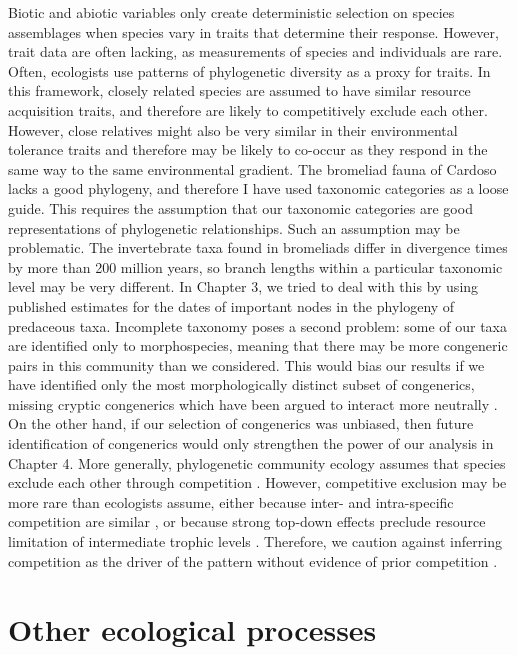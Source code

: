 Biotic and abiotic variables only create deterministic selection on
species assemblages when species vary in traits that determine their
response. However, trait data are often lacking, as measurements of
species and individuals are rare. Often, ecologists use patterns of
phylogenetic diversity as a proxy for traits. In this framework, closely
related species are assumed to have similar resource acquisition traits,
and therefore are likely to competitively exclude each other. However,
close relatives might also be very similar in their environmental
tolerance traits and therefore may be likely to co-occur as they respond
in the same way to the same environmental gradient. The bromeliad fauna
of Cardoso lacks a good phylogeny, and therefore I have used taxonomic
categories as a loose guide. This requires the assumption that our
taxonomic categories are good representations of phylogenetic
relationships. Such an assumption may be problematic. The invertebrate
taxa found in bromeliads differ in divergence times by more than 200
million years, so branch lengths within a particular taxonomic level may
be very different. In Chapter 3, we tried to deal with this by using
published estimates for the dates of important nodes in the phylogeny of
predaceous taxa. Incomplete taxonomy poses a second problem: some of our
taxa are identified only to morphospecies, meaning that there may be
more congeneric pairs in this community than we considered. This would
bias our results if we have identified only the most morphologically
distinct subset of congenerics, missing cryptic congenerics which have
been argued to interact more neutrally \citep{Siepielski2010}. On the
other hand, if our selection of congenerics was unbiased, then future
identification of congenerics would only strengthen the power of our
analysis in Chapter 4. More generally, phylogenetic community ecology
assumes that species exclude each other through competition
\citep{Narwani2015}. However, competitive exclusion may be more rare than
ecologists assume, either because inter- and intra-specific competition
are similar \citep{Hubbell1997}, or because strong top-down effects
preclude resource limitation of intermediate trophic levels
\citep{Holt2004}. Therefore, we caution against inferring competition as
the driver of the pattern without evidence of prior competition
\citep{CahillJr.2008}.

\section{Other ecological processes}\label{other-processes}

